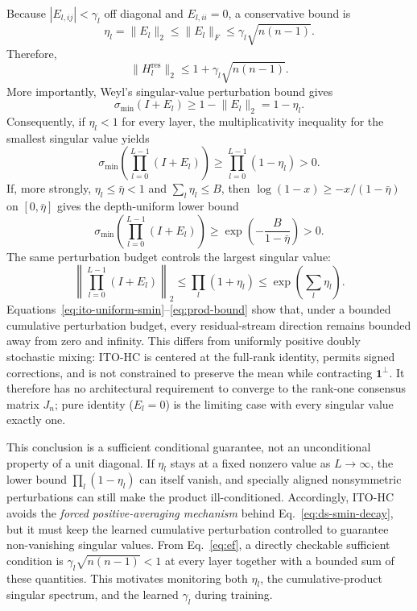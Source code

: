 \documentclass{article}
\newcommand{\Hres}{H^{\mathrm{res}}}
\newcommand{\norm}[1]{\lVert #1\rVert}
\begin{document}
Because $|E_{l,ij}|<\gamma_l$ off diagonal and $E_{l,ii}=0$, a conservative bound is
\begin{equation}
 \eta_l=\norm{E_l}_2\leq\norm{E_l}_F\leq\gamma_l\sqrt{n(n-1)}.
 \label{eq:ef}
\end{equation}
Therefore,
\begin{equation}
 \norm{\Hres_l}_2\leq1+\gamma_l\sqrt{n(n-1)}.
 \label{eq:hbound}
\end{equation}
More importantly, Weyl's singular-value perturbation bound gives \citep{horn2012matrix}
\begin{equation}
 \sigma_{\min}(I+E_l)\geq1-\norm{E_l}_2=1-\eta_l.
 \label{eq:ito-layer-smin}
\end{equation}
Consequently, if $\eta_l<1$ for every layer, the multiplicativity inequality for the smallest singular value yields
\begin{equation}
 \sigma_{\min}\!\left(\prod_{l=0}^{L-1}(I+E_l)\right)
 \geq\prod_{l=0}^{L-1}(1-\eta_l)>0.
 \label{eq:ito-product-smin}
\end{equation}
If, more strongly, $\eta_l\leq\bar\eta<1$ and $\sum_l\eta_l\leq B$, then $\log(1-x)\geq-x/(1-\bar\eta)$ on $[0,\bar\eta]$ gives the depth-uniform lower bound
\begin{equation}
 \sigma_{\min}\!\left(\prod_{l=0}^{L-1}(I+E_l)\right)
 \geq \exp\!\left(-\frac{B}{1-\bar\eta}\right)>0.
 \label{eq:ito-uniform-smin}
\end{equation}
The same perturbation budget controls the largest singular value:
\begin{equation}
 \left\|\prod_{l=0}^{L-1}(I+E_l)\right\|_2
 \leq\prod_l(1+\eta_l)\leq\exp\left(\sum_l\eta_l\right).
 \label{eq:prod-bound}
\end{equation}
Equations~\ref{eq:ito-uniform-smin}--\ref{eq:prod-bound} show that, under a bounded cumulative perturbation budget, every residual-stream direction remains bounded away from zero and infinity. This differs from uniformly positive doubly stochastic mixing: ITO-HC is centered at the full-rank identity, permits signed corrections, and is not constrained to preserve the mean while contracting $\mathbf 1^\perp$. It therefore has no architectural requirement to converge to the rank-one consensus matrix $J_n$; pure identity ($E_l=0$) is the limiting case with every singular value exactly one.

This conclusion is a sufficient conditional guarantee, not an unconditional property of a unit diagonal. If $\eta_l$ stays at a fixed nonzero value as $L\to\infty$, the lower bound $\prod_l(1-\eta_l)$ can itself vanish, and specially aligned nonsymmetric perturbations can still make the product ill-conditioned. Accordingly, ITO-HC avoids the \emph{forced positive-averaging mechanism} behind Eq.~\ref{eq:ds-smin-decay}, but it must keep the learned cumulative perturbation controlled to guarantee non-vanishing singular values. From Eq.~\ref{eq:ef}, a directly checkable sufficient condition is $\gamma_l\sqrt{n(n-1)}<1$ at every layer together with a bounded sum of these quantities. This motivates monitoring both $\eta_l$, the cumulative-product singular spectrum, and the learned $\gamma_l$ during training.
\end{document}
